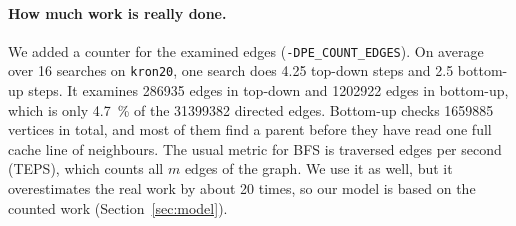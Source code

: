 \paragraph{How much work is really done.} We added a counter for the examined edges
(\texttt{-DPE\_COUNT\_EDGES}). On average over 16 searches on \texttt{kron20}, one search does
4.25 top-down steps and 2.5 bottom-up steps. It examines \num{286935} edges in top-down and
\num{1202922} edges in bottom-up, which is only \SI{4.7}{\percent} of the \num{31399382}
directed edges. Bottom-up checks \num{1659885} vertices in total, and most of them find a
parent before they have read one full cache line of neighbours. The usual metric for BFS is
traversed edges per second (TEPS), which counts all $m$ edges of the graph. We use it as well,
but it overestimates the real work by about 20 times, so our model is based on the counted
work (Section~\ref{sec:model}).
